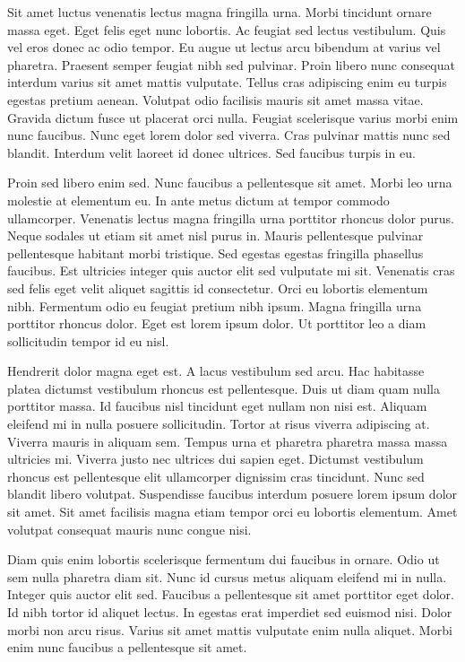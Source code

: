 \documentclass[11pt,a4paper]{article}
\begin{document}
Sit amet luctus venenatis lectus magna fringilla urna. Morbi tincidunt ornare massa eget. Eget felis eget nunc lobortis. Ac feugiat sed lectus vestibulum. Quis vel eros donec ac odio tempor. Eu augue ut lectus arcu bibendum at varius vel pharetra. Praesent semper feugiat nibh sed pulvinar. Proin libero nunc consequat interdum varius sit amet mattis vulputate. Tellus cras adipiscing enim eu turpis egestas pretium aenean. Volutpat odio facilisis mauris sit amet massa vitae. Gravida dictum fusce ut placerat orci nulla. Feugiat scelerisque varius morbi enim nunc faucibus. Nunc eget lorem dolor sed viverra. Cras pulvinar mattis nunc sed blandit. Interdum velit laoreet id donec ultrices. Sed faucibus turpis in eu.

Proin sed libero enim sed. Nunc faucibus a pellentesque sit amet. Morbi leo urna molestie at elementum eu. In ante metus dictum at tempor commodo ullamcorper. Venenatis lectus magna fringilla urna porttitor rhoncus dolor purus. Neque sodales ut etiam sit amet nisl purus in. Mauris pellentesque pulvinar pellentesque habitant morbi tristique. Sed egestas egestas fringilla phasellus faucibus. Est ultricies integer quis auctor elit sed vulputate mi sit. Venenatis cras sed felis eget velit aliquet sagittis id consectetur. Orci eu lobortis elementum nibh. Fermentum odio eu feugiat pretium nibh ipsum. Magna fringilla urna porttitor rhoncus dolor. Eget est lorem ipsum dolor. Ut porttitor leo a diam sollicitudin tempor id eu nisl.

Hendrerit dolor magna eget est. A lacus vestibulum sed arcu. Hac habitasse platea dictumst vestibulum rhoncus est pellentesque. Duis ut diam quam nulla porttitor massa. Id faucibus nisl tincidunt eget nullam non nisi est. Aliquam eleifend mi in nulla posuere sollicitudin. Tortor at risus viverra adipiscing at. Viverra mauris in aliquam sem. Tempus urna et pharetra pharetra massa massa ultricies mi. Viverra justo nec ultrices dui sapien eget. Dictumst vestibulum rhoncus est pellentesque elit ullamcorper dignissim cras tincidunt. Nunc sed blandit libero volutpat. Suspendisse faucibus interdum posuere lorem ipsum dolor sit amet. Sit amet facilisis magna etiam tempor orci eu lobortis elementum. Amet volutpat consequat mauris nunc congue nisi.

Diam quis enim lobortis scelerisque fermentum dui faucibus in ornare. Odio ut sem nulla pharetra diam sit. Nunc id cursus metus aliquam eleifend mi in nulla. Integer quis auctor elit sed. Faucibus a pellentesque sit amet porttitor eget dolor. Id nibh tortor id aliquet lectus. In egestas erat imperdiet sed euismod nisi. Dolor morbi non arcu risus. Varius sit amet mattis vulputate enim nulla aliquet. Morbi enim nunc faucibus a pellentesque sit amet.
\end{document}
